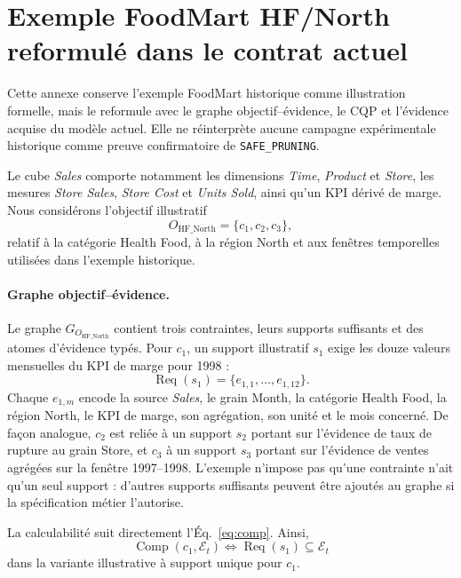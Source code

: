 \section{Exemple FoodMart HF/North reformulé dans le contrat actuel}
\label{app:foodmart-post-a8}

Cette annexe conserve l'exemple FoodMart historique comme illustration formelle, mais le reformule avec le graphe objectif--évidence, le CQP et l'évidence acquise du modèle actuel. Elle ne réinterprète aucune campagne expérimentale historique comme preuve confirmatoire de \texttt{SAFE\_PRUNING}.

Le cube \textit{Sales} comporte notamment les dimensions \textit{Time}, \textit{Product} et \textit{Store}, les mesures \textit{Store Sales}, \textit{Store Cost} et \textit{Units Sold}, ainsi qu'un KPI dérivé de marge. Nous considérons l'objectif illustratif
\[
O_{\mathrm{HF\_North}}=\{c_1,c_2,c_3\},
\]
relatif à la catégorie Health Food, à la région North et aux fenêtres temporelles utilisées dans l'exemple historique.

\paragraph*{Graphe objectif--évidence.}
Le graphe $G_{O_{\mathrm{HF\_North}}}$ contient trois contraintes, leurs supports suffisants et des atomes d'évidence typés. Pour $c_1$, un support illustratif $s_1$ exige les douze valeurs mensuelles du KPI de marge pour 1998 :
\[
\operatorname{Req}(s_1)=\{e_{1,1},\ldots,e_{1,12}\}.
\]
Chaque $e_{1,m}$ encode la source \textit{Sales}, le grain Month, la catégorie Health Food, la région North, le KPI de marge, son agrégation, son unité et le mois concerné. De façon analogue, $c_2$ est reliée à un support $s_2$ portant sur l'évidence de taux de rupture au grain Store, et $c_3$ à un support $s_3$ portant sur l'évidence de ventes agrégées sur la fenêtre 1997--1998. L'exemple n'impose pas qu'une contrainte n'ait qu'un seul support : d'autres supports suffisants peuvent être ajoutés au graphe si la spécification métier l'autorise.

La calculabilité suit directement l'Éq.~\eqref{eq:comp}. Ainsi,
\[
\operatorname{Comp}(c_1,\mathcal{E}_t)
\Longleftrightarrow
\operatorname{Req}(s_1)\subseteq\mathcal{E}_t
\]
dans la variante illustrative à support unique pour $c_1$.

